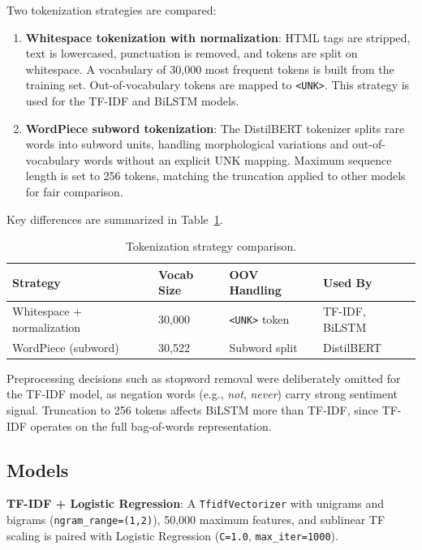 \documentclass[12pt,a4paper]{article}
\begin{document}
Two tokenization strategies are compared:

\begin{enumerate}
    \item \textbf{Whitespace tokenization with normalization}: HTML tags are stripped, text is lowercased, punctuation is removed, and tokens are split on whitespace. A vocabulary of 30{,}000 most frequent tokens is built from the training set. Out-of-vocabulary tokens are mapped to \texttt{<UNK>}. This strategy is used for the TF-IDF and BiLSTM models.

    \item \textbf{WordPiece subword tokenization}: The DistilBERT tokenizer splits rare words into subword units, handling morphological variations and out-of-vocabulary words without an explicit UNK mapping. Maximum sequence length is set to 256 tokens, matching the truncation applied to other models for fair comparison.
\end{enumerate}

Key differences are summarized in Table~\ref{tab:tokenization}.

\begin{table}[H]
\centering
\caption{Tokenization strategy comparison.}
\label{tab:tokenization}
\begin{tabular}{llll}
\toprule
\textbf{Strategy} & \textbf{Vocab Size} & \textbf{OOV Handling} & \textbf{Used By} \\
\midrule
Whitespace + normalization & 30{,}000 & \texttt{<UNK>} token & TF-IDF, BiLSTM \\
WordPiece (subword) & 30{,}522 & Subword split & DistilBERT \\
\bottomrule
\end{tabular}
\end{table}

Preprocessing decisions such as stopword removal were deliberately omitted for the TF-IDF model, as negation words (e.g., \textit{not}, \textit{never}) carry strong sentiment signal. Truncation to 256 tokens affects BiLSTM more than TF-IDF, since TF-IDF operates on the full bag-of-words representation.

\subsection{Models}

\textbf{TF-IDF + Logistic Regression}: A \texttt{TfidfVectorizer} with unigrams and bigrams (\texttt{ngram\_range=(1,2)}), 50{,}000 maximum features, and sublinear TF scaling is paired with Logistic Regression (\texttt{C=1.0}, \texttt{max\_iter=1000}).
\end{document}
